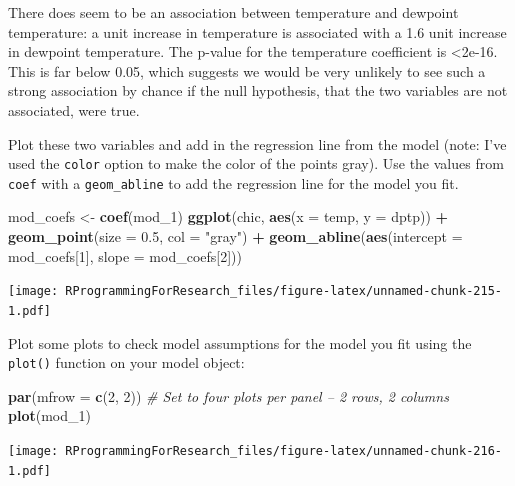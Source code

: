 \documentclass[]{book}
\makeatletter
\newenvironment{Shaded}{\begin{snugshade}}{\end{snugshade}}
\newcommand{\KeywordTok}[1]{\textcolor[rgb]{0.13,0.29,0.53}{\textbf{#1}}}
\newcommand{\DataTypeTok}[1]{\textcolor[rgb]{0.13,0.29,0.53}{#1}}
\newcommand{\DecValTok}[1]{\textcolor[rgb]{0.00,0.00,0.81}{#1}}
\newcommand{\FloatTok}[1]{\textcolor[rgb]{0.00,0.00,0.81}{#1}}
\newcommand{\StringTok}[1]{\textcolor[rgb]{0.31,0.60,0.02}{#1}}
\newcommand{\CommentTok}[1]{\textcolor[rgb]{0.56,0.35,0.01}{\textit{#1}}}
\newcommand{\OperatorTok}[1]{\textcolor[rgb]{0.81,0.36,0.00}{\textbf{#1}}}
\newcommand{\NormalTok}[1]{#1}
\newenvironment{kframe}{%
\medskip{}
\setlength{\fboxsep}{.8em}
 \def\at@end@of@kframe{}%
 \ifinner\ifhmode%
  \def\at@end@of@kframe{\end{minipage}}%
  \begin{minipage}{\columnwidth}%
 \fi\fi%
 \def\FrameCommand##1{\hskip\@totalleftmargin \hskip-\fboxsep
 \colorbox{shadecolor}{##1}\hskip-\fboxsep
     \hskip-\linewidth \hskip-\@totalleftmargin \hskip\columnwidth}%
 \MakeFramed {\advance\hsize-\width
   \@totalleftmargin\z@ \linewidth\hsize
   \@setminipage}}%
 {\par\unskip\endMakeFramed%
 \at@end@of@kframe}
\renewenvironment{Shaded}{\begin{kframe}}{\end{kframe}}
\theoremstyle{definition}
\theoremstyle{definition}
\theoremstyle{definition}
\theoremstyle{remark}
\makeatother
\begin{document}
There does seem to be an association between temperature and dewpoint
temperature: a unit increase in temperature is associated with a 1.6
unit increase in dewpoint temperature. The p-value for the temperature
coefficient is \textless{}2e-16. This is far below 0.05, which suggests
we would be very unlikely to see such a strong association by chance if
the null hypothesis, that the two variables are not associated, were
true.

Plot these two variables and add in the regression line from the model
(note: I've used the \texttt{color} option to make the color of the
points gray). Use the values from \texttt{coef} with a
\texttt{geom\_abline} to add the regression line for the model you fit.

\begin{Shaded}
\begin{Highlighting}[]
\NormalTok{mod_coefs <-}\StringTok{ }\KeywordTok{coef}\NormalTok{(mod_}\DecValTok{1}\NormalTok{)}
\KeywordTok{ggplot}\NormalTok{(chic, }\KeywordTok{aes}\NormalTok{(}\DataTypeTok{x =}\NormalTok{ temp, }\DataTypeTok{y =}\NormalTok{ dptp)) }\OperatorTok{+}\StringTok{ }
\StringTok{  }\KeywordTok{geom_point}\NormalTok{(}\DataTypeTok{size =} \FloatTok{0.5}\NormalTok{, }\DataTypeTok{col =} \StringTok{"gray"}\NormalTok{) }\OperatorTok{+}\StringTok{ }
\StringTok{  }\KeywordTok{geom_abline}\NormalTok{(}\KeywordTok{aes}\NormalTok{(}\DataTypeTok{intercept =}\NormalTok{ mod_coefs[}\DecValTok{1}\NormalTok{], }\DataTypeTok{slope =}\NormalTok{ mod_coefs[}\DecValTok{2}\NormalTok{]))}
\end{Highlighting}
\end{Shaded}

\texttt{[image: RProgrammingForResearch\_files/figure-latex/unnamed-chunk-215-1.pdf]}

Plot some plots to check model assumptions for the model you fit using
the \texttt{plot()} function on your model object:

\begin{Shaded}
\begin{Highlighting}[]
\KeywordTok{par}\NormalTok{(}\DataTypeTok{mfrow =} \KeywordTok{c}\NormalTok{(}\DecValTok{2}\NormalTok{, }\DecValTok{2}\NormalTok{)) }\CommentTok{# Set to four plots per panel -- 2 rows, 2 columns}
\KeywordTok{plot}\NormalTok{(mod_}\DecValTok{1}\NormalTok{)}
\end{Highlighting}
\end{Shaded}

\texttt{[image: RProgrammingForResearch\_files/figure-latex/unnamed-chunk-216-1.pdf]}
\end{document}
